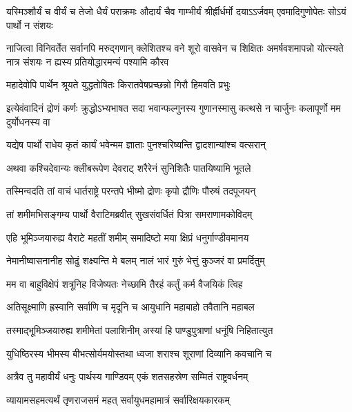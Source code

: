 \threelineshloka
{यस्मिञ्शौर्यं च वीर्यं च तेजो धैर्यं पराक्रमः}
{औदार्यं चैव गाम्भीर्यं श्रीर्ह्रीर्धर्मो दयाऽऽर्जवम्}
{एवमादिगुणोपेतः सोऽयं पार्थो न संशयः}


\onelineshloka
{नाजित्वा विनिवर्तेत सर्वानपि मरुद्गणान्}
\threelineshloka
{क्लेशितश्च वने शूरो वासवेन च शिक्षितः}
{अमर्षवशमापन्नो योत्स्यते नात्र संशयः}
{न ह्यस्य प्रतियोद्धारमन्यं पश्यामि कौरव}


\twolineshloka
{महादेवोपि पार्थेन श्रूयते युद्धतोषितः}
{किरातवेषप्रच्छन्नो गिरौ हिमवति प्रभुः}


\onelineshloka
{इत्येवंवादिनं द्रोणं कर्णः क्रुद्धोऽभ्यभाषत}
\twolineshloka
{सदा भवान्फल्गुनस्य गुणानस्मासु कत्थसे}
{न चार्जुनः कलापूर्णो मम दुर्योधनस्य वा}




\twolineshloka
{यद्येष पार्थो राधेय कृतं कार्यं भवेन्मम}
{ज्ञाताः पुनश्चरिष्यन्ति द्वादशान्यांश्च वत्सरान्}


\twolineshloka
{अथवा कश्चिदेवान्यः क्लीबरूपेण देवराट्}
{शरैरेनं सुनिशितैः पातयिष्यामि भूतले}



\twolineshloka
{तस्मिन्वदति तां वाचं धार्तराष्ट्रे परन्तपे}
{भीष्मो द्रोणः कृपो द्रौणिः पौरुषं तदपूजयन्}


\twolineshloka
{तां शमीमभिसङ्गम्य पार्थो वैराटिमब्रवीत्}
{सुखसंवर्धितं पित्रा समराणामकोविदम्}


\twolineshloka
{एहि भूमिञ्जयारुह्य वैराटे महतीं शमीम्}
{समादिष्टो मया क्षिप्रं धनुर्गाण्डीवमानय}


\twolineshloka
{नेमानीष्वासनानीह सोढुं शक्ष्यन्ति मे बलम्}
{नालं भारं गुरुं भेत्तुं कुञ्जरं वा प्रमर्दितुम्}


\twolineshloka
{मम वा बाहुविक्षेपं शत्रूनिह विजेष्यतः}
{नेच्छामि तैरहं कर्तुं कर्म वैजयिकं त्विह}


\twolineshloka
{अतिसूक्ष्माणि ह्रस्वानि सर्वाणि च मृदूनि च}
{आयुधानि महाबाहो तवैतानि महाबल}


\twolineshloka
{तस्माद्भूमिञ्जयारुह्य शमीमेतां पलाशिनीम्}
{अस्यां हि पाण्डुपुत्राणां धनूंषि निहितात्युत}


\twolineshloka
{युधिष्ठिरस्य भीमस्य बीभत्सोर्यमयोस्तथा}
{ध्वजा शराश्च शूराणां दिव्यानि कवचानि च}


\twolineshloka
{अत्रैव तु महावीर्यं धनुः पार्थस्य गाण्डिवम्}
{एकं शतसहस्रेण सम्मितं राष्ट्रवर्धनम्}


\twolineshloka
{व्यायामसहमत्यर्थं तृणराजसमं महत्}
{सर्वायुधमहामात्रं सर्वारिक्षयकारकम्}


